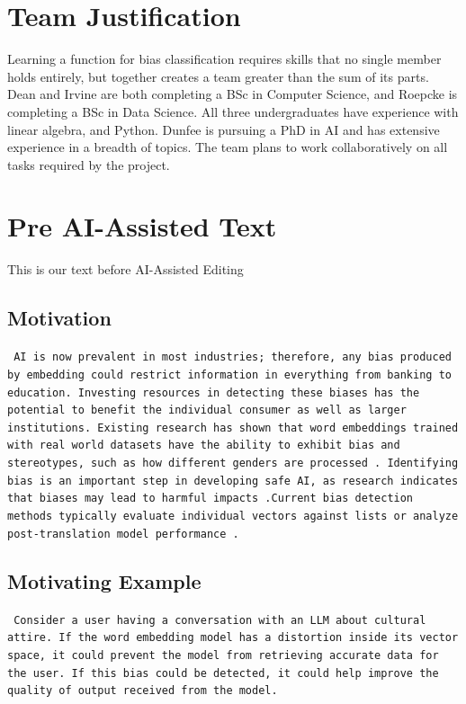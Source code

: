 \documentclass[sigconf]{acmart}
\begin{document}
\section{Team Justification}
Learning a function for bias classification requires skills that no single member holds entirely, but together creates a team greater than the sum of its parts. Dean and Irvine are both completing a BSc in Computer Science, and Roepcke is completing a BSc in Data Science. All three undergraduates have experience with linear algebra, 
and Python. Dunfee is pursuing a PhD in AI and has extensive experience in a breadth of topics. The team plans to work collaboratively on all tasks required by the project. 



 

\newpage
\appendix
\section{Pre AI-Assisted Text}
This is our text before AI-Assisted Editing

\subsection{Motivation}
\noindent\texttt{\small
AI is now prevalent in most industries; therefore, any bias produced by embedding could restrict information in everything from banking to education. Investing resources in detecting these biases has the potential to benefit the individual consumer as well as larger institutions. Existing research has shown that word embeddings trained with real world datasets have the ability to exhibit bias and stereotypes, such as how different genders are processed~\cite{NIPS2016_a486cd07}. Identifying bias is an important step in developing safe AI, as research indicates that biases may lead to harmful impacts~\cite{Schawrtz2022}.Current bias detection methods typically evaluate individual vectors against lists or analyze post-translation model performance \cite{badilla2020wefe}.}

\subsection{Motivating Example}
\noindent\texttt{\small
Consider a user having a conversation with an LLM about cultural attire. If the word embedding model has a distortion inside its vector space, it could prevent the model from retrieving accurate data for the user. If this bias could be detected, it could help improve the quality of output received from the model.}
\end{document}
